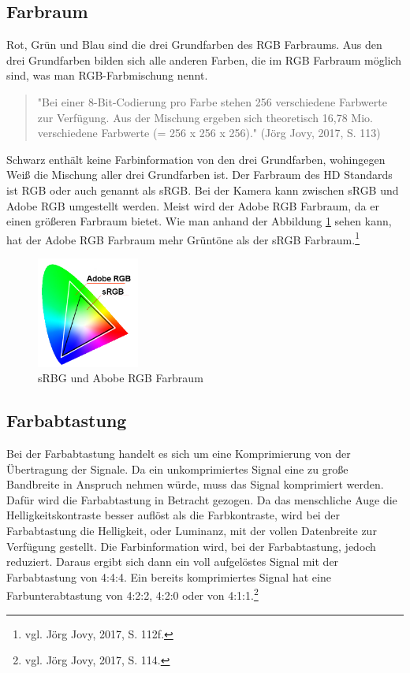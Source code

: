 \subsection{Farbraum}
Rot, Grün und Blau sind die drei Grundfarben des RGB Farbraums. Aus den drei Grundfarben bilden sich alle anderen Farben, die im RGB Farbraum möglich sind, was man RGB-Farbmischung nennt.\begin{quote}"Bei einer 8-Bit-Codierung pro Farbe stehen 256 verschiedene Farbwerte zur Verfügung. Aus der Mischung ergeben sich theoretisch 16,78 Mio. verschiedene Farbwerte (= 256 x 256 x 256)." (Jörg Jovy, 2017, S. 113)\end{quote} Schwarz enthält keine Farbinformation von den drei Grundfarben, wohingegen Weiß die Mischung aller drei Grundfarben ist. Der Farbraum des HD Standards ist RGB oder auch genannt als sRGB. Bei der Kamera kann zwischen sRGB und Adobe RGB umgestellt werden. Meist wird der Adobe RGB Farbraum, da er einen größeren Farbraum bietet. Wie man anhand der Abbildung \ref{fig:abb16} sehen kann, hat der Adobe RGB Farbraum mehr Grüntöne als der sRGB Farbraum.\footnote{\label{}vgl. Jörg Jovy, 2017, S. 112f.}
\begin{figure}[H]
\centering
	\includegraphics[width=0.3\textwidth]{abb16} 
	\caption{sRBG und Abobe RGB Farbraum}\label{fig:abb16}
\end{figure}
\subsection{Farbabtastung}
Bei der Farbabtastung handelt es sich um eine Komprimierung von  der Übertragung der Signale. Da ein unkomprimiertes Signal eine zu große Bandbreite in Anspruch nehmen würde, muss das Signal komprimiert werden. Dafür wird die Farbabtastung in Betracht gezogen. Da das menschliche Auge die Helligkeitskontraste besser auflöst als die Farbkontraste, wird bei der Farbabtastung die Helligkeit, oder Luminanz, mit der vollen Datenbreite zur Verfügung gestellt. Die Farbinformation wird, bei der Farbabtastung, jedoch reduziert. Daraus ergibt sich dann ein voll aufgelöstes Signal mit der Farbabtastung von 4:4:4. Ein bereits komprimiertes Signal hat eine Farbunterabtastung von 4:2:2, 4:2:0 oder von 4:1:1.\footnote{\label{}vgl. Jörg Jovy, 2017, S. 114.}
